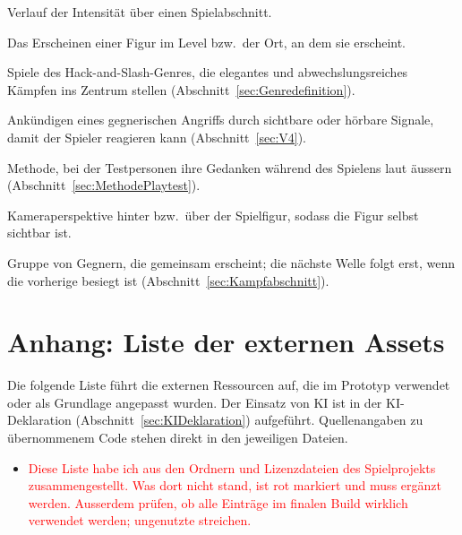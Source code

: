 \documentclass[../Main.tex]{subfiles}
\begin{document}
\begin{description}[style=unboxed, leftmargin=0cm, itemsep=0.3em]
\item[Spannungskurve] Verlauf der Intensität über einen Spielabschnitt.
\item[Spawn, Spawnpunkt] Das Erscheinen einer Figur im Level bzw.\ der Ort, an dem sie erscheint.
\item[Stylish-Action] Spiele des Hack-and-Slash-Genres, die elegantes und abwechslungsreiches Kämpfen ins Zentrum stellen (Abschnitt~\ref{sec:Genredefinition}).
\item[Telegrafieren] Ankündigen eines gegnerischen Angriffs durch sichtbare oder hörbare Signale, damit der Spieler reagieren kann (Abschnitt~\ref{sec:V4}).
\item[Think-aloud] Methode, bei der Testpersonen ihre Gedanken während des Spielens laut äussern (Abschnitt~\ref{sec:MethodePlaytest}).
\item[Third-Person-Perspektive] Kameraperspektive hinter bzw.\ über der Spielfigur, sodass die Figur selbst sichtbar ist.
\item[Welle] Gruppe von Gegnern, die gemeinsam erscheint; die nächste Welle folgt erst, wenn die vorherige besiegt ist (Abschnitt~\ref{sec:Kampfabschnitt}).
\end{description}

\newpage
\section{Anhang: Liste der externen Assets} \label{sec:Assets}

Die folgende Liste führt die externen Ressourcen auf, die im Prototyp verwendet oder als Grundlage angepasst wurden. Der Einsatz von KI ist in der KI-Deklaration (Abschnitt~\ref{sec:KIDeklaration}) aufgeführt. Quellenangaben zu übernommenem Code stehen direkt in den jeweiligen Dateien.

\begin{itemize}[leftmargin=1.5cm]
\item \textcolor{red}{Diese Liste habe ich aus den Ordnern und Lizenzdateien des Spielprojekts zusammengestellt. Was dort nicht stand, ist rot markiert und muss ergänzt werden. Ausserdem prüfen, ob alle Einträge im finalen Build wirklich verwendet werden; ungenutzte streichen.}
\end{itemize}
\end{document}
